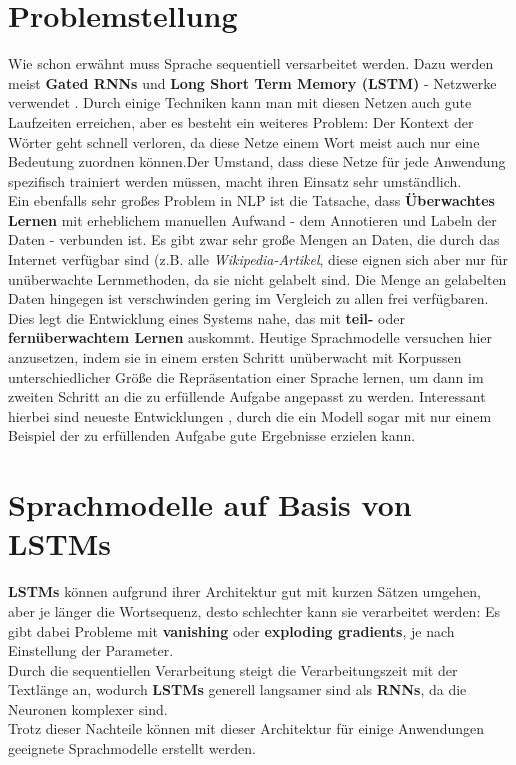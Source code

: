 \section{Problemstellung}
Wie schon erw\"ahnt muss Sprache sequentiell versarbeitet werden. Dazu werden meist \textbf{Gated RNNs} und \textbf{Long Short Term Memory (LSTM)} - Netzwerke verwendet \cite{attention}. Durch einige Techniken kann man mit diesen Netzen auch gute Laufzeiten erreichen, aber es besteht ein weiteres Problem: Der Kontext der W\"orter geht schnell verloren, da diese Netze einem Wort meist auch nur eine Bedeutung zuordnen k\"onnen.Der Umstand, dass diese Netze f\"ur jede Anwendung spezifisch trainiert werden m\"ussen, macht ihren Einsatz sehr umst\"andlich.\\
Ein ebenfalls sehr gro{\ss}es Problem in NLP ist die Tatsache, dass \textbf{\"Uberwachtes Lernen} mit erheblichem manuellen Aufwand - dem Annotieren und Labeln der Daten - verbunden ist. Es gibt zwar sehr gro{\ss}e Mengen an Daten, die durch das Internet verf\"ugbar sind (z.B. alle \textit{Wikipedia-Artikel}, diese eignen sich aber nur f\"ur un\"uberwachte Lernmethoden, da sie nicht gelabelt sind. Die Menge an gelabelten Daten hingegen ist verschwinden gering im Vergleich zu allen frei verf\"ugbaren. Dies legt die Entwicklung eines Systems nahe, das mit \textbf{teil-} oder \textbf{fern\"uberwachtem Lernen} auskommt. Heutige Sprachmodelle versuchen hier anzusetzen, indem sie in einem ersten Schritt un\"uberwacht mit Korpussen unterschiedlicher Gr\"o{\ss}e die Repr\"asentation einer Sprache lernen, um dann im zweiten Schritt an die zu erf\"ullende Aufgabe angepasst zu werden. Interessant hierbei sind neueste Entwicklungen \cite{gpt3}, durch die ein Modell sogar mit nur einem Beispiel der zu erf\"ullenden Aufgabe gute Ergebnisse erzielen kann.

\section{Sprachmodelle auf Basis von LSTMs}
\textbf{LSTMs} k\"onnen aufgrund ihrer Architektur gut mit kurzen S\"atzen umgehen, aber je l\"anger die Wortsequenz, desto schlechter kann sie verarbeitet werden: Es gibt dabei Probleme mit \textbf{vanishing} oder \textbf{exploding gradients}, je nach Einstellung der Parameter.\\
Durch die sequentiellen Verarbeitung steigt die Verarbeitungszeit mit der Textl\"ange an, wodurch \textbf{LSTMs} generell langsamer sind als \textbf{RNNs}, da die Neuronen komplexer sind.\\
Trotz dieser Nachteile k\"onnen mit dieser Architektur f\"ur einige Anwendungen geeignete Sprachmodelle erstellt werden.


